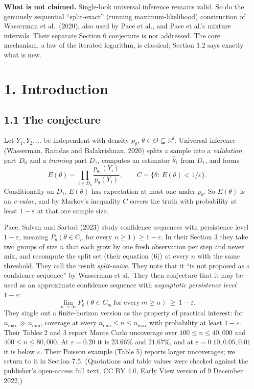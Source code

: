 \documentclass[
  10pt,
  a4paper,
]{article}
\begin{document}
\textbf{What is not claimed.} Single-look universal inference remains
valid. So do the genuinely sequential ``split-exact'' (running
maximum-likelihood) construction of Wasserman et al.~(2020), also used
by Pace et al., and Pace et al.'s mixture intervals. Their separate
Section 6 conjecture is not addressed. The core mechanism, a law of the
iterated logarithm, is classical; Section 1.2 says exactly what is new.

\section{1. Introduction}\label{introduction}

\subsection{1.1 The conjecture}\label{the-conjecture}

Let \(Y_1,Y_2,\dots\) be independent with density \(p_\theta\),
\(\theta\in\Theta\subseteq\mathbb R^d\). Universal inference (Wasserman,
Ramdas and Balakrishnan, 2020) splits a sample into a \emph{validation}
part \(D_0\) and a \emph{training} part \(D_1\), computes an estimator
\(\hat\theta_1\) from \(D_1\), and forms \[
E(\theta)=\prod_{i\in D_0}\frac{p_{\hat\theta_1}(Y_i)}{p_\theta(Y_i)},\qquad
C=\{\theta:\ E(\theta)<1/\varepsilon\}.
\] Conditionally on \(D_1\), \(E(\theta)\) has expectation at most one
under \(p_\theta\). So \(E(\theta)\) is an \emph{e-value}, and by
Markov's inequality \(C\) covers the truth with probability at least
\(1-\varepsilon\) at that one sample size.

Pace, Salvan and Sartori (2023) study confidence sequences with
persistence level \(1-\varepsilon\), meaning
\(P_\theta(\theta\in C_n\text{ for every }n\ge1)\ge1-\varepsilon\). In
their Section 3 they take two groups of size \(n\) that each grow by one
fresh observation per step and never mix, and recompute the split set
(their equation (6)) at every \(n\) with the same threshold. They call
the result \emph{split-naive}. They note that it ``is not proposed as a
confidence sequence'' by Wasserman et al.~They then conjecture that it
may be used as an approximate confidence sequence with \emph{asymptotic
persistence level} \(1-\varepsilon\): \[
\lim_{n\to\infty}P_\theta\left(\theta\in C_m\ \text{for every}\ m\ge n\right)\ \ge\ 1-\varepsilon. \tag{1.1}
\] They single out a finite-horizon version as the property of practical
interest: for \(n_{\max}\gg n_{\min}\), coverage at every
\(n_{\min}\le n\le n_{\max}\) with probability at least
\(1-\varepsilon\). Their Tables 2 and 3 report Monte Carlo uncoverage
over \(100\le n\le 40{,}000\) and \(400\le n\le 80{,}000\). At
\(\varepsilon=0.20\) it is \(23.66\%\) and \(21.67\%\), and at
\(\varepsilon=0.10,0.05,0.01\) it is below \(\varepsilon\). Their
Poisson example (Table 5) reports larger uncoverages; we return to it in
Section 7.5. (Quotations and table values were checked against the
publisher's open-access full text, CC BY 4.0, Early View version of 9
December 2022.)
\end{document}
